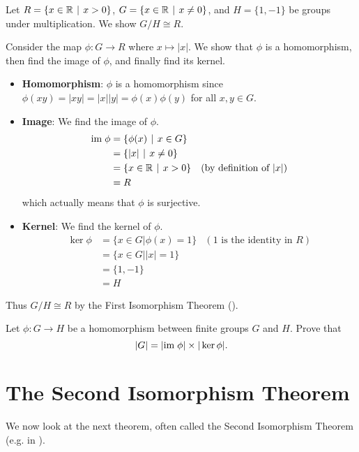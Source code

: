 \begin{example}
    Let $R = \{x \in \R \vert x > 0\}$, $G = \{x \in \R \vert x \neq 0\}$, and $H = \{1, -1\}$ be groups under multiplication. We show $G / H \cong R$.

    Consider the map $\phi: G \to R$ where $x \mapsto |x|$. We show that $\phi$ is a homomorphism, then find the image of $\phi$, and finally find its kernel.

    \begin{itemize}
        \item \textbf{Homomorphism}: $\phi$ is a homomorphism since $\phi(xy) = |xy| = |x||y| = \phi(x)\phi(y)$ for all $x, y \in G$.

        \item \textbf{Image}: We find the image of $\phi$.
        \begin{align*}
            \im\phi &= \{\phi(x) \vert x \in G\}\\
            &= \{|x| \vert x \neq 0\}\\
            &= \{x \in \R \vert x > 0\} & (\text{by definition of } |x|)\\
            &= R
        \end{align*}
        which actually means that $\phi$ is surjective.

        \item \textbf{Kernel}: We find the kernel of $\phi$.
        \begin{align*}
            \ker\phi &= \{x \in G \vert \phi(x) = 1\} & (1 \text{ is the identity in } R)\\
            &= \{x \in G \vert |x| = 1\}\\
            &= \{1, -1\}\\
            &= H
        \end{align*}
    \end{itemize}
    Thus $G/H \cong R$ by the First Isomorphism Theorem ().
\end{example}

\begin{exercise}
    Let $\phi: G \to H$ be a homomorphism between finite groups $G$ and $H$. Prove that
    \[
        |G| = |\mathrm{im}\; \phi|\times|\ker \phi|.
    \]
\end{exercise}

\section{The Second Isomorphism Theorem}
We now look at the next theorem, often called the Second Isomorphism Theorem (e.g. in {\cite[\S 69]{clark_1984}}).

